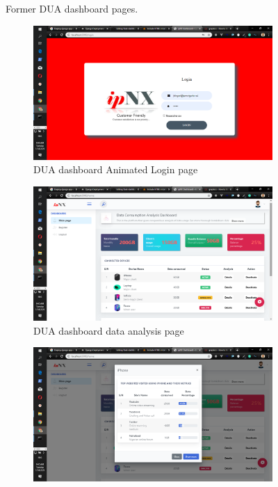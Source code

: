 \begin{itemize}
\begin{figure}[!htbp]
\begin{subfigure}[b]{0.45\textwidth}
		\end{subfigure}
		\caption{Former DUA dashboard pages.}
	\end{figure}
	\begin{figure}[!htbp]
		\centering
		\begin{subfigure}[b]{0.45\textwidth}
			\centering
			\includegraphics[width=\linewidth]{./dualogin}
			\caption{DUA dashboard Animated Login page}
		\end{subfigure}
		\hfill
		\begin{subfigure}[b]{0.45\textwidth}
			\centering
			\includegraphics[width=\linewidth]{./duadata}
			\caption{DUA dashboard data analysis page}
		\end{subfigure}
	\medskip
	\begin{subfigure}[b]{0.45\textwidth}
		\centering
		\includegraphics[width=\linewidth]{./duamodal}

\end{subfigure}
\end{figure}
\end{itemize}
